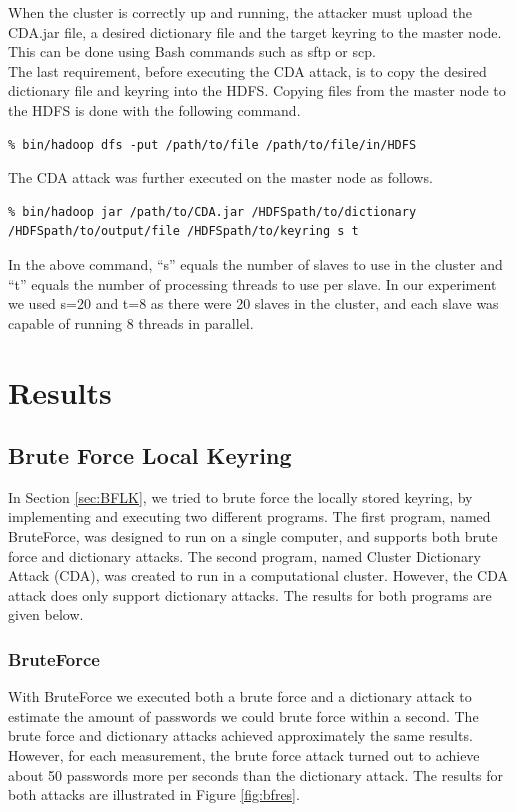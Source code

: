 \documentclass[pdftex,english,10pt,b5paper,twoside]{book}
\begin{document}
\noindent When the cluster is correctly up and running, the attacker must
upload the CDA.jar file, a desired dictionary file and the target keyring to the
master node. This can be done using Bash commands such as sftp or scp.\\

\noindent The last requirement, before executing the CDA attack, is to copy the
desired dictionary file and keyring into the HDFS. Copying files from the master
node to the HDFS is done with the following command.

\lstset{language=bash, label=lst:cpHDFS, caption=Copying files into HDFS}
\begin{lstlisting}
% bin/hadoop dfs -put /path/to/file /path/to/file/in/HDFS
\end{lstlisting}

\noindent The CDA attack was further executed on the master node as follows.

\lstset{language=bash, label=lst:CDA, caption=Executing the CDA attack}
\begin{lstlisting}
% bin/hadoop jar /path/to/CDA.jar /HDFSpath/to/dictionary /HDFSpath/to/output/file /HDFSpath/to/keyring s t
\end{lstlisting}
In the above command, ``s'' equals the number of slaves to use in the cluster
and ``t'' equals the number of processing threads to use per slave. In our
experiment we used s=20 and t=8 as there were 20 slaves in the cluster, and each
slave was capable of running 8 threads in parallel.
\chapter{Results}
\section{Brute Force Local Keyring}
In Section \ref{sec:BFLK}, we tried to brute force the locally stored keyring,
by implementing and executing two different programs. The first program, named
BruteForce, was designed to run on a single computer, and supports both brute force and
dictionary attacks. The second program, named Cluster Dictionary Attack (CDA), was created to run in a
computational cluster. However, the CDA attack does only support dictionary attacks. The results for
both programs are given below.

\subsection{BruteForce}
With BruteForce we executed both a brute force and a dictionary attack to estimate the
amount of passwords we could brute force within a second. The brute force
and dictionary attacks achieved approximately the same results. However, for
each measurement, the brute force attack turned out to achieve about 50
passwords more per seconds than the dictionary attack. The results for both
attacks are illustrated in Figure \ref{fig:bfres}.
\end{document}
